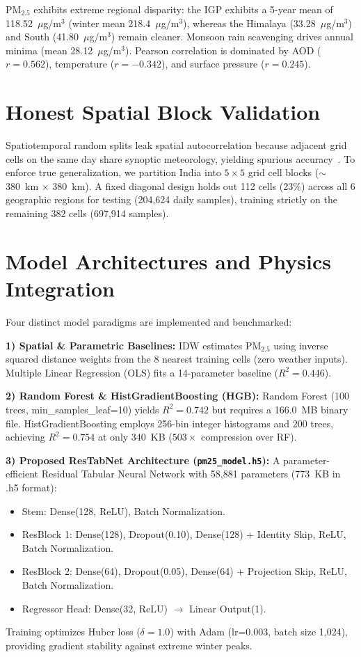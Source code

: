 \documentclass[conference]{IEEEtran}
\begin{document}
PM$_{2.5}$ exhibits extreme regional disparity: the IGP exhibits a 5-year mean of 118.52~$\mu$g/m$^3$ (winter mean 218.4~$\mu$g/m$^3$), whereas the Himalaya (33.28~$\mu$g/m$^3$) and South (41.80~$\mu$g/m$^3$) remain cleaner. Monsoon rain scavenging drives annual minima (mean 28.12~$\mu$g/m$^3$). Pearson correlation is dominated by AOD ($r = 0.562$), temperature ($r = -0.342$), and surface pressure ($r = 0.245$).

\section{Honest Spatial Block Validation}
Spatiotemporal random splits leak spatial autocorrelation because adjacent grid cells on the same day share synoptic meteorology, yielding spurious accuracy~\cite{b2}. To enforce true generalization, we partition India into $5\times 5$ grid cell blocks ($\sim$380~km $\times$ 380~km). A fixed diagonal design holds out 112 cells (23\%) across all 6 geographic regions for testing (204,624 daily samples), training strictly on the remaining 382 cells (697,914 samples).

\section{Model Architectures and Physics Integration}
Four distinct model paradigms are implemented and benchmarked:

\textbf{1) Spatial \& Parametric Baselines:} IDW estimates PM$_{2.5}$ using inverse squared distance weights from the 8 nearest training cells (zero weather inputs). Multiple Linear Regression (OLS) fits a 14-parameter baseline ($R^2 = 0.446$).

\textbf{2) Random Forest \& HistGradientBoosting (HGB):} Random Forest (100 trees, min\_samples\_leaf=10) yields $R^2 = 0.742$ but requires a 166.0~MB binary file. HistGradientBoosting employs 256-bin integer histograms and 200 trees, achieving $R^2 = 0.754$ at only 340~KB ($503\times$ compression over RF).

\textbf{3) Proposed ResTabNet Architecture (\texttt{pm25\_model.h5}):} A parameter-efficient Residual Tabular Neural Network with 58,881 parameters (773~KB in .h5 format):
\begin{itemize}
    \item Stem: Dense(128, ReLU), Batch Normalization.
    \item ResBlock 1: Dense(128), Dropout(0.10), Dense(128) + Identity Skip, ReLU, Batch Normalization.
    \item ResBlock 2: Dense(64), Dropout(0.05), Dense(64) + Projection Skip, ReLU, Batch Normalization.
    \item Regressor Head: Dense(32, ReLU) $\to$ Linear Output(1).
\end{itemize}
Training optimizes Huber loss ($\delta = 1.0$) with Adam (lr=0.003, batch size 1,024), providing gradient stability against extreme winter peaks.
\end{document}
